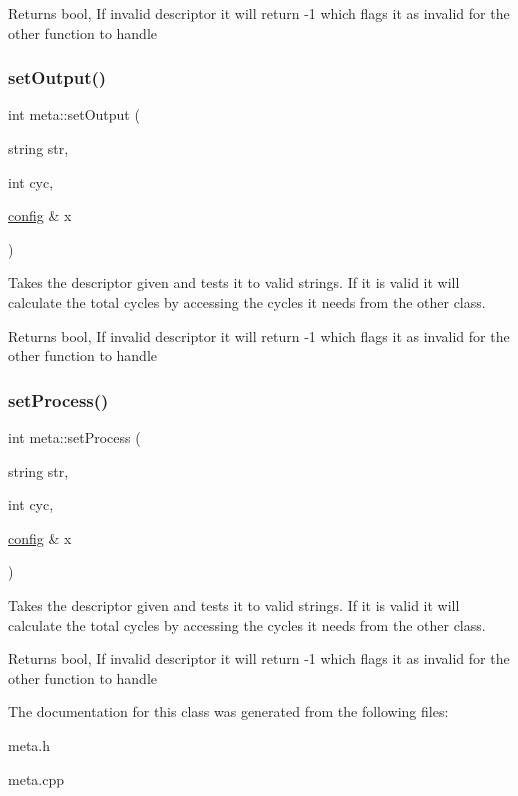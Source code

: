\begin{DoxyReturn}{Returns}
bool, If invalid descriptor it will return -\/1 which flags it as invalid for the other function to handle 
\end{DoxyReturn}
\mbox{\label{classmeta_adf22457ef8edc4d8d9cf61f077593ae1}} 
\subsubsection{\texorpdfstring{setOutput()}{setOutput()}}
{\footnotesize\ttfamily int meta\+::set\+Output (\begin{DoxyParamCaption}\item[{string}]{str,  }\item[{int}]{cyc,  }\item[{\mbox{\hyperlink{classconfig}{config}} \&}]{x }\end{DoxyParamCaption})}



Takes the descriptor given and tests it to valid strings. If it is valid it will calculate the total cycles by accessing the cycles it needs from the other class. 

\begin{DoxyReturn}{Returns}
bool, If invalid descriptor it will return -\/1 which flags it as invalid for the other function to handle 
\end{DoxyReturn}
\mbox{\label{classmeta_ae2ae12882e80f96acc82e0c55dba8fe6}} 
\subsubsection{\texorpdfstring{setProcess()}{setProcess()}}
{\footnotesize\ttfamily int meta\+::set\+Process (\begin{DoxyParamCaption}\item[{string}]{str,  }\item[{int}]{cyc,  }\item[{\mbox{\hyperlink{classconfig}{config}} \&}]{x }\end{DoxyParamCaption})}



Takes the descriptor given and tests it to valid strings. If it is valid it will calculate the total cycles by accessing the cycles it needs from the other class. 

\begin{DoxyReturn}{Returns}
bool, If invalid descriptor it will return -\/1 which flags it as invalid for the other function to handle 
\end{DoxyReturn}


The documentation for this class was generated from the following files\+:\begin{DoxyCompactItemize}
\item 
meta.\+h\item 
meta.\+cpp\end{DoxyCompactItemize}
